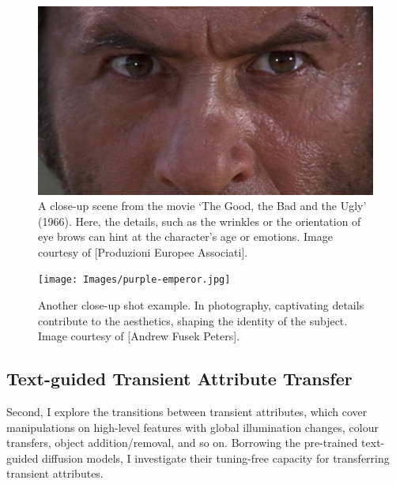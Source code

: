 \begin{figure}[ht]
  \centering

    \includegraphics[width=0.8\linewidth]{Images/A scene from ‘The Good, the Bad and the Ugly’ (1966). Image courtesy- Produzioni Europee Associati .jpg}

   \caption{A close-up scene from the movie ‘The Good, the Bad and the Ugly’ (1966). Here, the details, such as the wrinkles or the orientation of eye brows can hint at the character's age or emotions. Image courtesy of [Produzioni Europee Associati].}
   \label{fig:close-up1}
\end{figure}


\begin{figure}%
  \centering
   \texttt{[image: Images/purple-emperor.jpg]}
   
   \caption{Another close-up shot example. In photography, captivating details contribute to the aesthetics, shaping the identity of the subject. Image courtesy of [Andrew Fusek Peters].}
   \label{fig:close-up2}
\end{figure}

\newpage
\subsection{Text-guided Transient Attribute Transfer} 
Second, I explore the transitions between transient attributes, which cover manipulations on high-level features with global illumination changes, colour transfers, object addition/removal, and so on. Borrowing the pre-trained text-guided diffusion models, I investigate their tuning-free capacity for transferring transient attributes.

